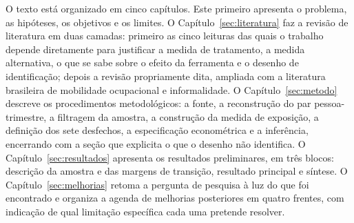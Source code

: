 O texto está organizado em cinco capítulos. Este primeiro apresenta o problema,
as hipóteses, os objetivos e os limites. O Capítulo~\ref{sec:literatura} faz a
revisão de literatura em duas camadas: primeiro as cinco leituras das quais o
trabalho depende diretamente para justificar a medida de tratamento, a medida
alternativa, o que se sabe sobre o efeito da ferramenta e o desenho de
identificação; depois a revisão propriamente dita, ampliada com a literatura
brasileira de mobilidade ocupacional e informalidade. O
Capítulo~\ref{sec:metodo} descreve os procedimentos metodológicos: a fonte, a
reconstrução do par pessoa-trimestre, a filtragem da amostra, a construção da
medida de exposição, a definição dos sete desfechos, a especificação
econométrica e a inferência, encerrando com a seção que explicita o que o
desenho não identifica. O Capítulo~\ref{sec:resultados} apresenta os resultados
preliminares, em três blocos: descrição da amostra e das margens de transição,
resultado principal e síntese. O Capítulo~\ref{sec:melhorias} retoma a pergunta
de pesquisa à luz do que foi encontrado e organiza a agenda de melhorias
posteriores em quatro frentes, com indicação de qual limitação específica cada
uma pretende resolver.
